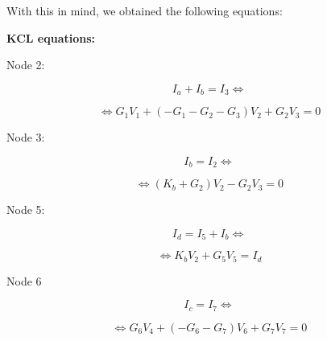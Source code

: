 With this in mind, we obtained the following equations:

\vspace{0.5cm}

\textbf{KCL equations:}

\vspace{0.3cm}

Node 2:

\begin{equation}
	I_a + I_b = I_3 \Leftrightarrow
	\label{eq:kcl2a}
\end{equation}

\begin{equation}
	\Leftrightarrow G_1V_1 + (-G_1-G_2-G_3)V_2 + G_2V_3 = 0 
	\label{eq:kcl2b}
\end{equation}

\vspace{0.3cm}

Node 3:

\begin{equation}
	I_b = I_2 \Leftrightarrow
	\label{eq:kcl3a}
\end{equation}

\begin{equation}
	\Leftrightarrow (K_b + G_2)V_2 - G_2V_3 = 0 
	\label{eq:kcl3b}
\end{equation}

\vspace{0.3cm}

Node 5:

\begin{equation}
	I_d = I_5 + I_b \Leftrightarrow
	\label{eq:kcl5a}
\end{equation}

\begin{equation}
	\Leftrightarrow K_bV_2 + G_5V_5 = I_d 
	\label{eq:kcl5b}
\end{equation}

\vspace{0.3cm}

Node 6

\begin{equation}
	I_c = I_7 \Leftrightarrow
	\label{eq:kcl6a}
\end{equation}

\begin{equation}
	\Leftrightarrow G_6V_4 + (-G_6 - G_7)V_6 + G_7V_7 = 0
	\label{eq:kcl6b}
\end{equation}

\vspace{1cm}

